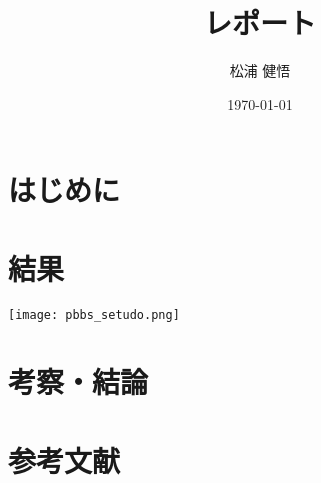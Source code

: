 \documentclass{jsreport}
\begin{document}
\title{レポート}
\author{松浦 健悟}
\date{\today}
\maketitle

\section{はじめに}

\section{}
\section{}

\section{結果}

\texttt{[image: pbbs\_setudo.png]}

\section{考察・結論}
\section{参考文献}
\end{document}
